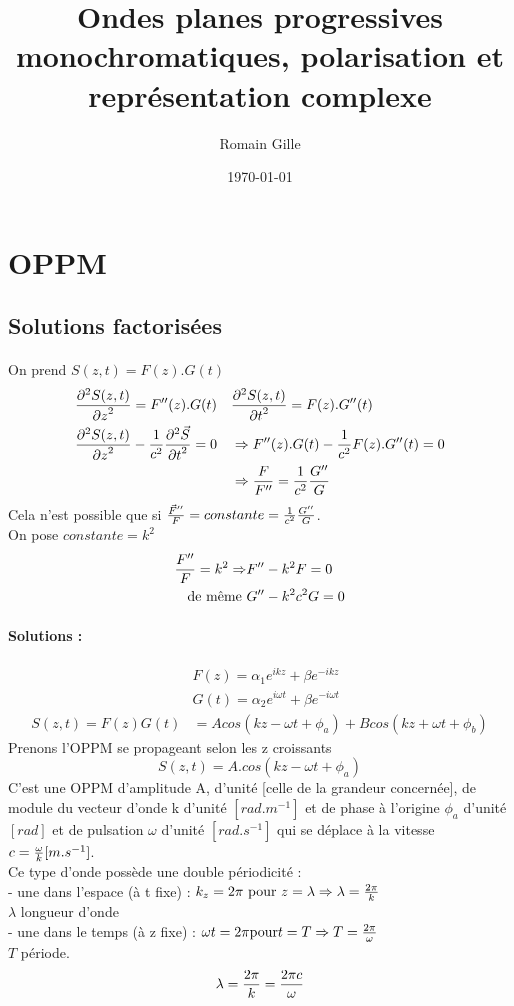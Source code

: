 \documentclass[11pt,a4paper,french]{article}
\title{Ondes planes progressives monochromatiques, polarisation et représentation complexe}
\author{Romain Gille}
\date{\today}
\begin{document}
\maketitle
\newpage
\section{OPPM}
\subsection{Solutions factorisées}
\paragraph{}
On prend $S(z,t) =  F(z).G(t)$
\begin{align*}
&{\partial^2 S(z, t) \over {\partial z}^2} = F''(z) . G(t) &&{\partial^2 S(z, t) \over {\partial t}^2} = F(z) . G''(t) \\
&{\partial^2 S(z, t) \over {\partial z}^2} -{1 \over c^2}{\partial^2 \vec S \over {\partial t}^2} = 0 &&\Rightarrow F''(z).G(t) - {1 \over c^2} F(z) . G''(t) = 0 \\&
&& \Rightarrow {F \over F''} = {1 \over c^2}{G''\over G}
\end{align*}
Cela n'est possible que si ${\vec F'' \over F} = constante = {1 \over c^2 }{G'' \over G}$. \\
On pose $constante = k^2$
\begin{align*}
{F'' \over F} = k^2 \Rightarrow &F'' - k^2F = 0 \\
\text{de même}~ &G'' - k^2c^2G = 0
\end{align*}
\paragraph{Solutions : }
\begin{align*}
&F(z)=\alpha_1 e^{ikz}+ \beta e^{-ikz}\\
&G(t)=\alpha_2 e^{i\omega t}+ \beta e^{-i\omega t} \\
S(z, t)=F(z)G(t) &= A cos(kz-\omega t + \phi_a) + B cos(kz + \omega t+ \phi_b)
\end{align*}
Prenons l'OPPM se propageant selon les z croissants
$$S(z, t) = A.cos(kz - \omega t + \phi_a)$$
C'est une OPPM d'amplitude A, d'unité [celle de la grandeur concernée], de module du vecteur d'onde k d'unité $[rad.m^{-1}]$ et de phase à l'origine $\phi_a$ d'unité $[rad]$ et de pulsation $\omega$ d'unité $[rad.s^{-1}]$ qui se déplace à la vitesse $c = {\omega \over k}[m.s^{-1}]$. \\
Ce type d'onde possède une double périodicité :\\
- une dans l'espace (à t fixe) : $k_z = 2\pi ~\text{pour}~ z = \lambda \Rightarrow \lambda= {2 \pi \over k}$ \\
$\lambda$ longueur d'onde \\
- une dans le temps (à z fixe) : $\omega t = 2\pi \text{pour} t = T \Rightarrow T={2\pi \over \omega}$ \\
$T$ période.
$$\lambda = {2\pi \over k} = {2\pi c \over \omega}$$
\end{document}

